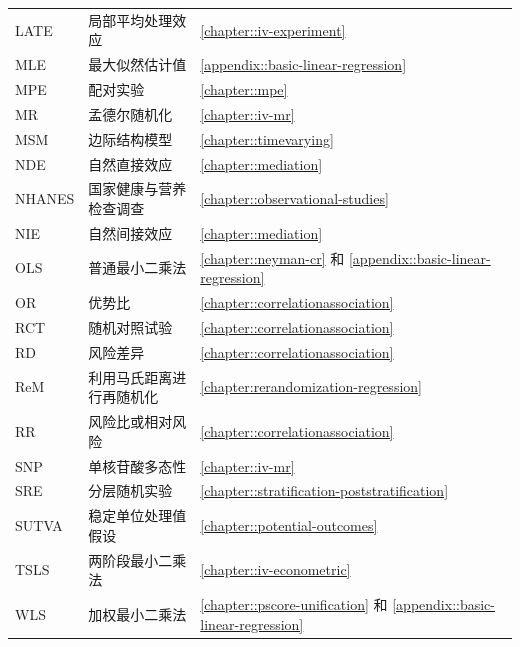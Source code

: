 \begin{tabular}{lll}
   LATE & 局部平均处理效应 & \ref{chapter::iv-experiment} \\
    MLE & 最大似然估计值 & \ref{appendix::basic-linear-regression} \\
 MPE & 配对实验 & \ref{chapter::mpe}\\
  MR & 孟德尔随机化 & \ref{chapter::iv-mr} \\
 MSM & 边际结构模型 & \ref{chapter::timevarying} \\
 NDE& 自然直接效应 & \ref{chapter::mediation} \\
 NHANES & 国家健康与营养检查调查 & \ref{chapter::observational-studies}\\
 NIE & 自然间接效应 & \ref{chapter::mediation} \\
    OLS & 普通最小二乘法 & \ref{chapter::neyman-cr} 和 \ref{appendix::basic-linear-regression}\\
OR & 优势比 & \ref{chapter::correlationassociation}\\
 RCT & 随机对照试验 & \ref{chapter::correlationassociation}\\
 RD & 风险差异 & \ref{chapter::correlationassociation} \\
 ReM & 利用马氏距离进行再随机化 & \ref{chapter:rerandomization-regression}\\
RR & 风险比或相对风险 & \ref{chapter::correlationassociation}\\
SNP & 单核苷酸多态性 & \ref{chapter::iv-mr} \\
  SRE& 分层随机实验 & \ref{chapter::stratification-poststratification}\\
 SUTVA & 稳定单位处理值假设 & \ref{chapter::potential-outcomes} \\
 TSLS & 两阶段最小二乘法 & \ref{chapter::iv-econometric} \\
   WLS & 加权最小二乘法 & \ref{chapter::pscore-unification} 和 \ref{appendix::basic-linear-regression}\\
\hline 
\end{tabular}
 

